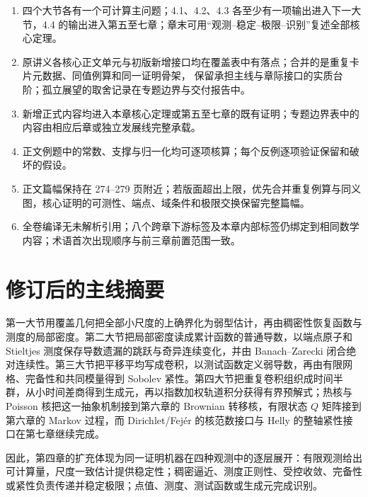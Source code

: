 \documentclass[11pt,a4paper]{ctexart}
\begin{document}
\begin{enumerate}
\item 四个大节各有一个可计算主问题；4.1、4.2、4.3 各至少有一项输出进入下一大节，4.4 的输出进入第五至七章；章末可用“观测--稳定--极限--识别”复述全部核心定理。
\item 原讲义各核心正文单元与初版新增接口均在覆盖表中有落点；合并的是重复卡片元数据、同值例算和同一证明骨架，
      保留承担主线与章际接口的实质台阶；孤立展望的取舍记录在专题边界与交付报告中。
\item 新增正式内容均进入本章核心定理或第五至七章的既有证明；专题边界表中的内容由相应后章或独立发展线完整承载。
\item 正文例题中的常数、支撑与归一化均可逐项核算；每个反例逐项验证保留和破坏的假设。
\item 正文篇幅保持在 274--279 页附近；若版面超出上限，优先合并重复例算与同义图，核心证明的可测性、端点、域条件和极限交换保留完整篇幅。
\item 全卷编译无未解析引用；八个跨章下游标签及本章内部标签仍绑定到相同数学内容；术语首次出现顺序与前三章前置范围一致。
\end{enumerate}

\section{修订后的主线摘要}

第一大节用覆盖几何把全部小尺度的上确界化为弱型估计，再由稠密性恢复函数与测度的局部密度。第二大节把局部密度读成累计函数的普通导数，以端点原子和 Stieltjes 测度保存导数遗漏的跳跃与奇异连续变化，并由 Banach--Zarecki 闭合绝对连续性。第三大节把平移平均写成卷积，以测试函数定义弱导数，再由有限网格、完备性和共同模量得到 Sobolev 紧性。第四大节把重复卷积组织成时间半群，从小时间差商得到生成元，再以指数加权轨道积分获得有界预解式；热核与 Poisson 核把这一抽象机制接到第六章的 Brownian 转移核，有限状态 $Q$ 矩阵接到第六章的 Markov 过程，而 Dirichlet/Fej\'er 的核范数接口与 Helly 的整轴紧性接口在第七章继续完成。

因此，第四章的扩充体现为同一证明机器在四种观测中的逐层展开：有限观测给出可计算量，尺度一致估计提供稳定性；稠密逼近、测度正则性、受控收敛、完备性或紧性负责传递并稳定极限；点值、测度、测试函数或生成元完成识别。
\end{document}
